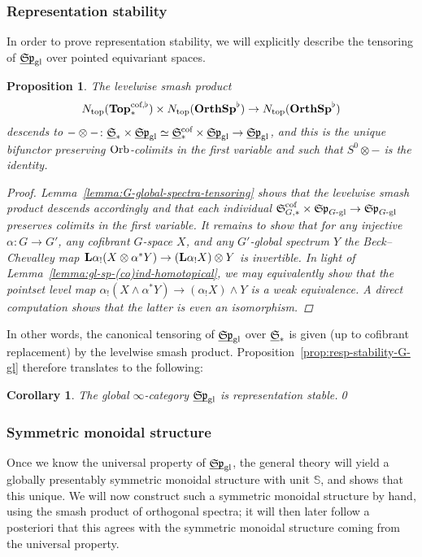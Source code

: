 \documentclass[reqno]{memo-l}
\theoremstyle{mythm}
\newtheorem{cor}[thm]{Corollary}
\newtheorem{prop}[thm]{Proposition}
\theoremstyle{definition}
\numberwithin{equation}{section}
\newcommand{\gl}{\textup{gl}}
\newcommand{\Ntop}{{N_\textup{top}}}
\newcommand{\cat}[1]{\textbf{\textup{#1}}}
\newcommand{\dual}{\flat}
\newcommand{\Orb}{{\vphantom{\textup{t}}\smash{\textup{Orb}}}}
\newcommand{\ulhelper}[2]{\underline{\setbox0=\hbox{$#1#2$}\dp0=0.4pt \box0\relax}}
\newcommand{\ul}[1]{{\mathpalette\ulhelper{#1}}\hbox{\rule[-2pt]{0pt}{0pt}}}
\let\smashp=\wedge
\newcommand{\mySp}{{\mathfrak S\kern-.5pt\mathfrak p}}
\newcommand{\myS}{{{\mathfrak S\kern-.4pt}}}
\newcommand{\osp}{{\textbf{\textup{OrthSp}}}}
\begin{document}
\subsubsection{Representation stability}
In order to prove representation stability, we will explicitly describe the tensoring of $\ul\mySp_\gl$ over pointed equivariant spaces. 

\begin{prop}
    The levelwise smash product
    \begin{equation}\label{eq:levelwise-smash-before-loc}
        \Ntop(\cat{Top}_*^\textup{cof,$\dual$})\times\Ntop(\osp^\dual)\to\Ntop(\osp^\dual)
    \end{equation}    
    descends to $-\otimes-\colon\ul\myS_*\times\ul\mySp_\gl\simeq \ul\myS_*^\textup{cof}\times\ul\mySp_\gl\to\ul\mySp_\gl$, and this is the unique bifunctor preserving $\Orb$-colimits in the first variable and such that $S^0\otimes-$ is the identity.
    \begin{proof}
        Lemma~\ref{lemma:G-global-spectra-tensoring} shows that the levelwise smash product descends accordingly and that each individual $\myS_{G,*}^\text{cof}\times\mySp_\text{$G$-gl}\to\mySp_\text{$G$-gl}$ preserves colimits in the first variable. It remains to show that for any injective $\alpha\colon G\to G'$, any cofibrant $G$-space $X$, and any $G'$-global spectrum $Y$ the Beck--Chevalley map $\cat{L}\alpha_!(X\otimes \alpha^*Y)\to (\cat{L}\alpha_!X)\otimes Y$ is invertible. In light of Lemma~\ref{lemma:gl-sp-(co)ind-homotopical}, we may equivalently show that the pointset level map $\alpha_!(X\smashp \alpha^*Y)\to(\alpha_!X)\smashp Y$ is a weak equivalence. A direct computation shows that the latter is even an isomorphism.
    \end{proof}
\end{prop}

In other words, the canonical tensoring of $\ul\mySp_\gl$ over $\ul\myS_*$ is given (up to cofibrant replacement) by the levelwise smash product. Proposition~\ref{prop:resp-stability-G-gl} therefore translates to the following:

\begin{cor}\label{cor:Spgl-rep-stable}
    The global $\infty$-category $\ul\mySp_\gl$ is representation stable.\qed
\end{cor}

\subsubsection{Symmetric monoidal structure} Once we know the universal property of $\ul\mySp_\gl$, the general theory will yield a globally presentably symmetric monoidal structure with unit $\mathbb S$, and shows that this unique. We will now construct such a symmetric monoidal structure by hand, using the smash product of orthogonal spectra; it will then later follow a posteriori that this agrees with the symmetric monoidal structure coming from the universal property.
\end{document}
